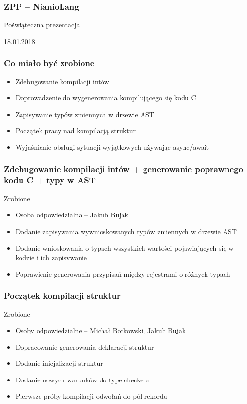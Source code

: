\documentclass{beamer}
\begin{document}
	\begin{frame}
		\frametitle{ZPP -- NianioLang}
		Poświąteczna prezentacja
		
		18.01.2018
	\end{frame}
	
	\begin{frame}
		\frametitle{Co miało być zrobione}
		\begin{itemize}
			\item Zdebugowanie kompilacji intów
			\item Doprowadzenie do wygenerowania kompilującego się kodu C
			\item Zapisywanie typów zmiennych w drzewie AST
			\item Początek pracy nad kompilacją struktur
			\item Wyjaśnienie obsługi sytuacji wyjątkowych używając async/await
		\end{itemize}
	\end{frame}
	
	\begin{frame}[fragile]
		\frametitle{Zdebugowanie kompilacji intów + generowanie poprawnego kodu C + typy w AST}
		\color{green} Zrobione
		\begin{itemize}
			\item Osoba odpowiedzialna -- Jakub Bujak
			\item Dodanie zapisywania wywnioskowanych typów zmiennych w drzewie AST
			\item Dodanie wnioskowania o typach wszystkich wartości pojawiających się w kodzie i ich zapisywanie
			\item Poprawienie generowania przypisań między rejestrami o różnych typach
		\end{itemize}
	\end{frame}
	
	\begin{frame}[fragile]
		\frametitle{Początek kompilacji struktur}
		\color{green} Zrobione
		\begin{itemize}
		 \item Osoby odpowiedzialne -- Michał Borkowski, Jakub Bujak
		 \item Dopracowanie generowania deklaracji struktur
		 \item Dodanie inicjalizacji struktur
		 \item Dodanie nowych warunków do type checkera
		 \item Pierwsze próby kompilacji odwołań do pól rekordu
		\end{itemize}
	\end{frame}
	
\end{document}
